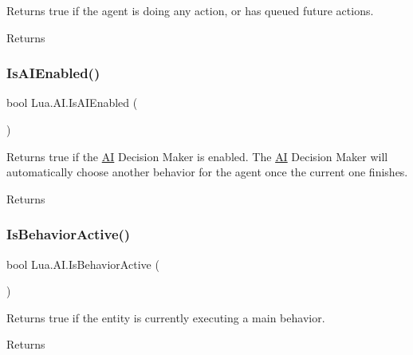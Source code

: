 Returns true if the agent is doing any action, or has queued future actions. 

\begin{DoxyReturn}{Returns}

\end{DoxyReturn}
\mbox{\label{class_lua_1_1_a_i_afbbbf8be061465aba93a7b1c73402ae4}} 
\subsubsection{\texorpdfstring{IsAIEnabled()}{IsAIEnabled()}}
{\footnotesize\ttfamily bool Lua.\+A\+I.\+Is\+A\+I\+Enabled (\begin{DoxyParamCaption}{ }\end{DoxyParamCaption})}



Returns true if the \mbox{\hyperlink{class_lua_1_1_a_i}{AI}} Decision Maker is enabled. The \mbox{\hyperlink{class_lua_1_1_a_i}{AI}} Decision Maker will automatically choose another behavior for the agent once the current one finishes. 

\begin{DoxyReturn}{Returns}

\end{DoxyReturn}
\mbox{\label{class_lua_1_1_a_i_a2d682616c9d7a8fd7ea045906a716e02}} 
\subsubsection{\texorpdfstring{IsBehaviorActive()}{IsBehaviorActive()}}
{\footnotesize\ttfamily bool Lua.\+A\+I.\+Is\+Behavior\+Active (\begin{DoxyParamCaption}{ }\end{DoxyParamCaption})}



Returns true if the entity is currently executing a main behavior. 

\begin{DoxyReturn}{Returns}

\end{DoxyReturn}
\mbox{\label{class_lua_1_1_a_i_a60b9147746afd2cbbdf7e6ee5f7c6aff}} 
